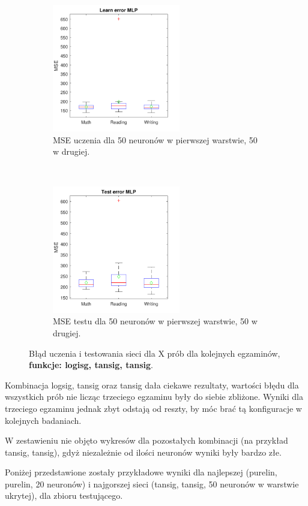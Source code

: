 \documentclass[12pt]{article}
\begin{document}
\begin{figure}[H]
\begin{subfigure}[t]{0.48\textwidth} 
\centering
\includegraphics[height=2.2in]{logsig_tansig_tansig_50_learnBoxplot.pdf}
\caption{MSE uczenia dla  50 neuronów w pierwszej warstwie, 50 w drugiej.}
\end{subfigure}
~~
\begin{subfigure}[t]{0.48\textwidth} 
\centering
\includegraphics[height=2.2in]{logsig_tansig_tansig_50_testBoxplot.pdf}
\caption{MSE testu dla 50 neuronów w pierwszej warstwie, 50 w drugiej.}
\end{subfigure}

\caption{Błąd uczenia i testowania sieci dla X prób dla kolejnych egzaminów, \textbf{funkcje: logisg, tansig, tansig}.}
\end{figure}

Kombinacja logsig, tansig oraz tansig dała ciekawe rezultaty, wartości błędu dla wszystkich prób nie licząc trzeciego egzaminu były do siebie zbliżone. Wyniki dla trzeciego egzaminu jednak zbyt odstają od reszty, by móc brać tą konfiguracje w kolejnych badaniach.

W zestawieniu nie objęto wykresów dla pozostałych kombinacji (na przykład tansig, tansig),  gdyż niezależnie od ilości neuronów wyniki były bardzo złe.

\vspace{0.5cm}

Poniżej przedstawione zostały przykładowe wyniki dla najlepszej (purelin, purelin, 20 neuronów) i najgorszej sieci (tansig, tansig, 50 neuronów w warstwie ukrytej), dla zbioru testującego.
\end{document}
